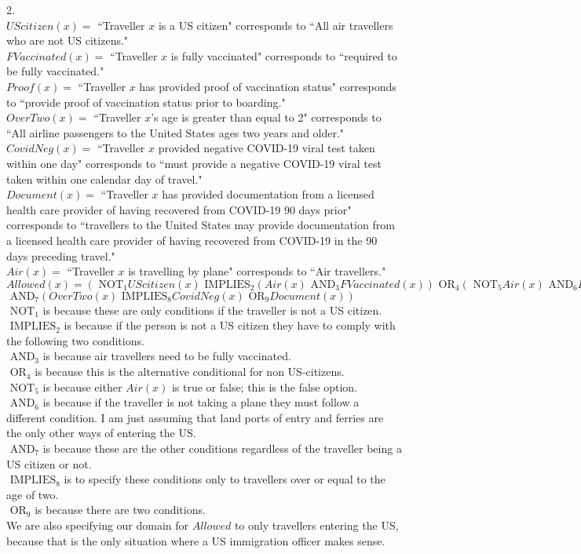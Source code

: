 \documentclass[11pt]{article}
\newcommand{\andd}{\text{ AND}}
\newcommand{\orr}{\text{ OR}}
\newcommand{\nott}{\text{ NOT}}
\newcommand{\imp}{\text{ IMPLIES}}
\begin{document}
\begin{flushleft}
2. \\
\bigskip
$UScitizen(x) = $ ``Traveller $x$ is a US citizen" corresponds to ``All air travellers who are not US citizens." \\
\bigskip
$FVaccinated(x) = $ ``Traveller $x$ is fully vaccinated" corresponds to ``required to be fully vaccinated." \\
\bigskip
$Proof(x) = $ ``Traveller $x$ has provided proof of vaccination status" corresponds to ``provide proof of vaccination status prior to boarding." \\
\bigskip
$OverTwo(x) = $ ``Traveller $x$'s age is greater than equal to 2" corresponds to ``All airline passengers to the United States ages two years and older." \\
\bigskip
$CovidNeg(x) = $ ``Traveller $x$ provided negative COVID-19 viral test taken within one day" corresponds to ``must provide a negative COVID-19 viral test
taken within one calendar day of travel." \\
\bigskip
$Document(x) = $ ``Traveller $x$ has provided documentation from a licensed health care provider of having recovered from COVID-19 90 days prior" corresponds to ``travellers to the United
States may provide documentation from a licensed health care provider of having
recovered from COVID-19 in the 90 days preceding travel." \\
\bigskip
$Air(x) = $ ``Traveller $x$ is travelling by plane" corresponds to ``Air travellers." \\
\bigskip
$Allowed(x) = (\nott_1 UScitizen(x) \imp_2 (Air(x) \andd_3 FVaccinated(x)) \orr_4 (\nott_5 Air(x) \andd_6 Proof(x)))$ \\
$\andd_7 (OverTwo(x) \imp_8 CovidNeg(x) \orr_9 Document(x))$ \\
\bigskip
$\nott_1$ is because these are only conditions if the traveller is not a US citizen. \\
$\imp_2$ is because if the person is not a US citizen they have to comply with the following two conditions. \\
$\andd_3$ is because air travellers need to be fully vaccinated. \\
$\orr_4$ is because this is the alternative conditional for non US-citizens. \\
$\nott_5$ is because either $Air(x)$ is true or false; this is the false option. \\
$\andd_6$ is because if the traveller is not taking a plane they must follow a different condition. I am just assuming that land ports of entry and ferries are the only other ways of entering the US. \\
$\andd_7$ is because these are the other conditions regardless of the traveller being a US citizen or not. \\
$\imp_8$ is to specify these conditions only to travellers over or equal to the age of two. \\
$\orr_9$ is because there are two conditions. \\
\bigskip
We are also specifying our domain for $Allowed$ to only travellers entering the US, because that is the only situation where a US immigration officer makes sense.

\end{flushleft}
\end{document}
